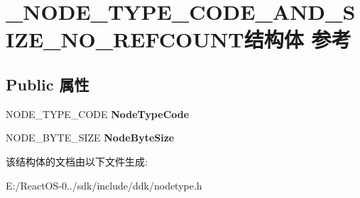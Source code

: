 \hypertarget{struct___n_o_d_e___t_y_p_e___c_o_d_e___a_n_d___s_i_z_e___n_o___r_e_f_c_o_u_n_t}{}\section{\+\_\+\+N\+O\+D\+E\+\_\+\+T\+Y\+P\+E\+\_\+\+C\+O\+D\+E\+\_\+\+A\+N\+D\+\_\+\+S\+I\+Z\+E\+\_\+\+N\+O\+\_\+\+R\+E\+F\+C\+O\+U\+N\+T结构体 参考}
\label{struct___n_o_d_e___t_y_p_e___c_o_d_e___a_n_d___s_i_z_e___n_o___r_e_f_c_o_u_n_t}
\subsection*{Public 属性}
\begin{DoxyCompactItemize}
\item 
\mbox{\label{struct___n_o_d_e___t_y_p_e___c_o_d_e___a_n_d___s_i_z_e___n_o___r_e_f_c_o_u_n_t_af299254c1cfc598194ac6a2df0fd89c6}} 
N\+O\+D\+E\+\_\+\+T\+Y\+P\+E\+\_\+\+C\+O\+DE {\bfseries Node\+Type\+Code}
\item 
\mbox{\label{struct___n_o_d_e___t_y_p_e___c_o_d_e___a_n_d___s_i_z_e___n_o___r_e_f_c_o_u_n_t_a8c3c724b7289186b5da8516870d329d1}} 
N\+O\+D\+E\+\_\+\+B\+Y\+T\+E\+\_\+\+S\+I\+ZE {\bfseries Node\+Byte\+Size}
\end{DoxyCompactItemize}


该结构体的文档由以下文件生成\+:\begin{DoxyCompactItemize}
\item 
E\+:/\+React\+O\+S-\/0../sdk/include/ddk/nodetype.\+h\end{DoxyCompactItemize}
